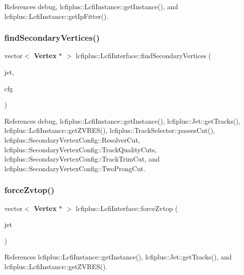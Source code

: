 References debug, lcfiplus\+::\+Lcfi\+Instance\+::get\+Instance(), and lcfiplus\+::\+Lcfi\+Instance\+::get\+Ip\+Fitter().

\mbox{\label{classlcfiplus_1_1LcfiInterface_a2dfb4d75842b594688ee1dd193a90f6d}} 
\subsubsection{find\+Secondary\+Vertices()}
{\footnotesize\ttfamily vector$<$ \textbf{ Vertex} $\ast$ $>$ lcfiplus\+::\+Lcfi\+Interface\+::find\+Secondary\+Vertices (\begin{DoxyParamCaption}\item[{const \textbf{ Jet} $\ast$}]{jet,  }\item[{const \textbf{ Secondary\+Vertex\+Config} \&}]{cfg }\end{DoxyParamCaption})}



References debug, lcfiplus\+::\+Lcfi\+Instance\+::get\+Instance(), lcfiplus\+::\+Jet\+::get\+Tracks(), lcfiplus\+::\+Lcfi\+Instance\+::get\+Z\+V\+R\+E\+S(), lcfiplus\+::\+Track\+Selector\+::passes\+Cut(), lcfiplus\+::\+Secondary\+Vertex\+Config\+::\+Resolver\+Cut, lcfiplus\+::\+Secondary\+Vertex\+Config\+::\+Track\+Quality\+Cuts, lcfiplus\+::\+Secondary\+Vertex\+Config\+::\+Track\+Trim\+Cut, and lcfiplus\+::\+Secondary\+Vertex\+Config\+::\+Two\+Prong\+Cut.

\mbox{\label{classlcfiplus_1_1LcfiInterface_a6fbfb1bc658041181913e1def5309b98}} 
\subsubsection{force\+Zvtop()}
{\footnotesize\ttfamily vector$<$ \textbf{ Vertex} $\ast$ $>$ lcfiplus\+::\+Lcfi\+Interface\+::force\+Zvtop (\begin{DoxyParamCaption}\item[{const \textbf{ Jet} \&}]{jet }\end{DoxyParamCaption})}



References lcfiplus\+::\+Lcfi\+Instance\+::get\+Instance(), lcfiplus\+::\+Jet\+::get\+Tracks(), and lcfiplus\+::\+Lcfi\+Instance\+::get\+Z\+V\+R\+E\+S().



